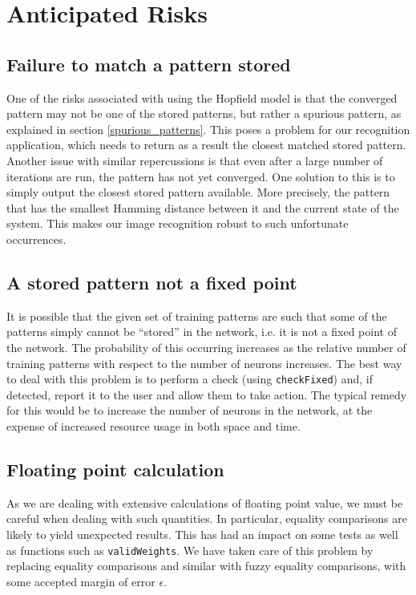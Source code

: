\section{Anticipated Risks}

\subsection{Failure to match a pattern stored}
One of the risks associated with using the Hopfield model is that the converged pattern may not be one of the stored patterns, but rather a spurious pattern, as explained in section \ref{spurious_patterns}. This poses a problem for our recognition application, which needs to return as a result the closest matched stored pattern. Another issue with similar repercussions is that even after a large number of iterations are run, the pattern has not yet converged.
One solution to this is to simply output the closest stored pattern available. More precisely, the pattern that has the smallest Hamming distance between it and the current state of the system. This makes our image recognition robust to such unfortunate occurrences.


\subsection{A stored pattern not a fixed point}
It is possible that the given set of training patterns are such that some of the patterns simply cannot be ``stored'' in the network, i.e. it is not a fixed point of the network. The probability of this occurring increases as the relative number of training patterns with respect to the number of neurons increases.
The best way to deal with this problem is to perform a check (using \texttt{checkFixed}) and, if detected, report it  to the user and allow them to take action. The typical remedy for this would be to increase the number of neurons in the network, at the expense of increased resource usage in both space and time.


\subsection{Floating point calculation}
As we are dealing with extensive calculations of floating point value, we must be careful when dealing with such quantities. In particular, equality comparisons are likely to yield unexpected results. This has had an impact on some tests as well as functions such as \texttt{validWeights}. We have taken care of this problem by replacing equality comparisons and similar with fuzzy equality comparisons, with some accepted margin of error $\epsilon$.
